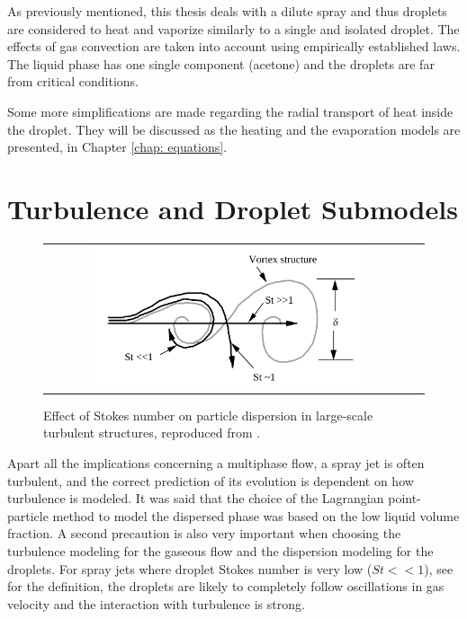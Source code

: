 As previously mentioned, this thesis deals with a dilute spray and thus droplets are considered to heat and vaporize similarly to a single and isolated droplet. The effects of gas convection are taken into account using empirically established laws. The liquid phase has one single component (acetone) and the droplets are far from critical conditions.

Some more simplifications are made regarding the radial transport of heat inside the droplet. They will be discussed as the heating and the evaporation models are presented, in Chapter \ref{chap: equations}.

\section{Turbulence and Droplet Submodels}

\begin{figure}[h]
 \centering
\begin{tabular}{cc}
 \includegraphics[width=0.75\textwidth]{./figuras/chap1/stokes.png}
\end{tabular}
 \caption{Effect of Stokes number on particle dispersion in large-scale turbulent structures, reproduced from \cite{crowe1988particle}.}
 \label{fig: intro_stokes}
\end{figure}

Apart all the implications concerning a multiphase flow, a spray jet is often turbulent, and the correct prediction of its evolution is dependent on how turbulence is modeled. It was said that the choice of the Lagrangian point-particle method to model the dispersed phase was based on the low liquid volume fraction. A second precaution is also very important when choosing the turbulence modeling for the gaseous flow and the dispersion modeling for the droplets. For spray jets where droplet Stokes number is very low ($St << 1$), see \cite{crowe1988particle} for the definition, the droplets are likely to completely follow oscillations in gas velocity and the interaction with turbulence is strong.

